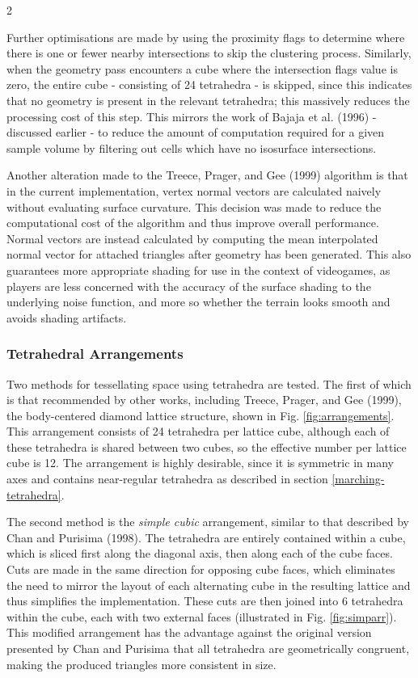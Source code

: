 \documentclass[]{article}
\begin{document}
\FloatBarrier
\begin{multicols}{2}

Further optimisations are made by using the proximity flags to determine where there is one or fewer nearby intersections to skip the clustering process. Similarly, when the geometry pass encounters a cube where the intersection flags value is zero, the entire cube - consisting of 24 tetrahedra - is skipped, since this indicates that no geometry is present in the relevant tetrahedra; this massively reduces the processing cost of this step. This mirrors the work of Bajaja et al. (1996) - discussed earlier - to reduce the amount of computation required for a given sample volume by filtering out cells which have no isosurface intersections.

Another alteration made to the Treece, Prager, and Gee (1999) algorithm is that in the current implementation, vertex normal vectors are calculated naively without evaluating surface curvature. This decision was made to reduce the computational cost of the algorithm and thus improve overall performance. Normal vectors are instead calculated by computing the mean interpolated normal vector for attached triangles after geometry has been generated. This also guarantees more appropriate shading for use in the context of videogames, as players are less concerned with the accuracy of the surface shading to the underlying noise function, and more so whether the terrain looks smooth and avoids shading artifacts.

\subsubsection{Tetrahedral Arrangements}\label{tetrahedral-arrangements}

Two methods for tessellating space using tetrahedra are tested. The first of which is that recommended by other works, including Treece, Prager, and Gee (1999), the body-centered diamond lattice structure, shown in Fig. \ref{fig:arrangements}. This arrangement consists of 24 tetrahedra per lattice cube, although each of these tetrahedra is shared between two cubes, so the effective number per lattice cube is 12. The arrangement is highly desirable, since it is symmetric in many axes and contains near-regular tetrahedra as described in section \ref{marching-tetrahedra}.

The second method is the \emph{\textquotesingle simple cubic\textquotesingle{}} arrangement, similar to that described by Chan and Purisima (1998). The tetrahedra are entirely contained within a cube, which is sliced first along the diagonal axis, then along each of the cube faces. Cuts are made in the same direction for opposing cube faces, which eliminates the need to mirror the layout of each alternating cube in the resulting lattice and thus simplifies the implementation. These cuts are then joined into 6 tetrahedra within the cube, each with two external faces (illustrated in Fig. \ref{fig:simparr}). This modified arrangement has the advantage against the original version presented by Chan and Purisima that all tetrahedra are geometrically congruent, making the produced triangles more consistent in size.


\end{multicols}
\end{document}
